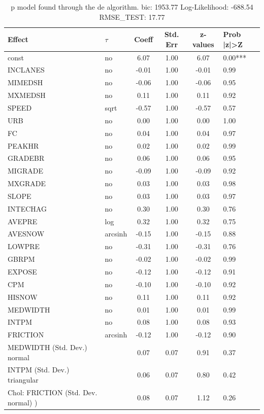 \begin{table}
	\caption{p model found through the de algorithm. bic: 1953.77 Log-Likelihood: -688.54 RMSE_TEST: 17.77}
	\begin{center}
		\begin{tabular}{|l|l|c|c|c|l|}
			\hline
			Effect & $\tau$ & Coeff & Std. Err & z-values & Prob |z|>Z \\
			\hline
			const & no & 6.07 & 1.00 & 6.07 & 0.00*** \\
			\hline
			INCLANES & no & -0.01 & 1.00 & -0.01 & 0.99 \\
			\hline
			MIMEDSH & no & -0.06 & 1.00 & -0.06 & 0.95 \\
			\hline
			MXMEDSH & no & 0.11 & 1.00 & 0.11 & 0.92 \\
			\hline
			SPEED & sqrt & -0.57 & 1.00 & -0.57 & 0.57 \\
			\hline
			URB & no & 0.00 & 1.00 & 0.00 & 1.00 \\
			\hline
			FC & no & 0.04 & 1.00 & 0.04 & 0.97 \\
			\hline
			PEAKHR & no & 0.02 & 1.00 & 0.02 & 0.99 \\
			\hline
			GRADEBR & no & 0.06 & 1.00 & 0.06 & 0.95 \\
			\hline
			MIGRADE & no & -0.09 & 1.00 & -0.09 & 0.92 \\
			\hline
			MXGRADE & no & 0.03 & 1.00 & 0.03 & 0.98 \\
			\hline
			SLOPE & no & 0.03 & 1.00 & 0.03 & 0.97 \\
			\hline
			INTECHAG & no & 0.30 & 1.00 & 0.30 & 0.76 \\
			\hline
			AVEPRE & log & 0.32 & 1.00 & 0.32 & 0.75 \\
			\hline
			AVESNOW & arcsinh & -0.15 & 1.00 & -0.15 & 0.88 \\
			\hline
			LOWPRE & no & -0.31 & 1.00 & -0.31 & 0.76 \\
			\hline
			GBRPM & no & -0.02 & 1.00 & -0.02 & 0.99 \\
			\hline
			EXPOSE & no & -0.12 & 1.00 & -0.12 & 0.91 \\
			\hline
			CPM & no & -0.10 & 1.00 & -0.10 & 0.92 \\
			\hline
			HISNOW & no & 0.11 & 1.00 & 0.11 & 0.92 \\
			\hline
			MEDWIDTH & no & 0.01 & 1.00 & 0.01 & 0.99 \\
			\hline
			INTPM & no & 0.08 & 1.00 & 0.08 & 0.93 \\
			\hline
			FRICTION & arcsinh & -0.12 & 1.00 & -0.12 & 0.90 \\
			\hline
			MEDWIDTH (Std. Dev.) normal &  & 0.07 & 0.07 & 0.91 & 0.37 \\
			\hline
			INTPM (Std. Dev.) triangular &  & 0.06 & 0.07 & 0.80 & 0.42 \\
			\hline
			 Chol: FRICTION (Std. Dev. normal) ) &  & 0.08 & 0.07 & 1.12 & 0.26 \\
			\hline
		\end{tabular}
	\end{center}
\end{table}
